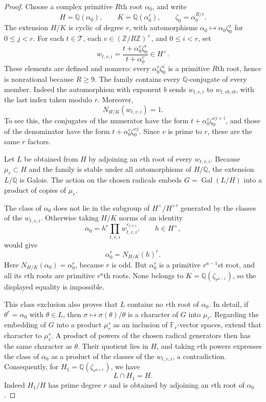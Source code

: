 \documentclass[11pt]{article}
\theoremstyle{definition}
\theoremstyle{remark}
\begin{document}
\begin{proof}
Choose a complex primitive $R$th root $\alpha_0$, and write
\[
 H=\mathbb Q(\alpha_0),\qquad
 K=\mathbb Q(\alpha_0^r),\qquad
 \zeta_0=\alpha_0^{R/r}.
\]
The extension $H/K$ is cyclic of degree $r$, with automorphisms
$\alpha_0\mapsto\alpha_0\zeta_0^j$ for $0\leq j<r$.
For each $t\in\mathcal T$, each
$v\in(\mathbb Z/R\mathbb Z)^\times$, and $0\leq i<r$, set
\[
 w_{t,v,i}
   =\frac{t+\alpha_0^v\zeta_0^i}{t+\alpha_0^v}\in H^\times.
\]
These elements are defined and nonzero: every
$\alpha_0^v\zeta_0^i$ is a primitive $R$th root, hence is
nonrational because $R\geq9$.
The family contains every $\mathbb Q$-conjugate of every member.
Indeed the automorphism with exponent $b$ sends
$w_{t,v,i}$ to $w_{t,vb,ib}$, with the last index taken modulo $r$.
Moreover,
\[
 N_{H/K}(w_{t,v,i})=1.
\]
To see this, the conjugates of the numerator have the form
$t+\alpha_0^v\zeta_0^{vj+i}$, and those of the denominator
have the form $t+\alpha_0^v\zeta_0^{vj}$.
Since $v$ is prime to $r$, these are the same $r$ factors.

Let $L$ be obtained from $H$ by adjoining an $r$th root of every
$w_{t,v,i}$.  Because $\mu_r\subset H$ and the family is stable
under all automorphisms of $H/\mathbb Q$, the extension
$L/\mathbb Q$ is Galois.  The action on the chosen radicals
embeds $G=\operatorname{Gal}(L/H)$ into a product of copies
of $\mu_r$.

The class of $\alpha_0$ does not lie in the subgroup of
$H^\times/H^{\times r}$ generated by the classes of the
$w_{t,v,i}$.  Otherwise taking $H/K$ norms of an identity
\[
 \alpha_0=h^r\prod_{t,v,i}w_{t,v,i}^{e_{t,v,i}},
 \qquad h\in H^\times,
\]
would give
\[
 \alpha_0^r=N_{H/K}(h)^r.
\]
Here $N_{H/K}(\alpha_0)=\alpha_0^r$, because $r$ is odd.
But $\alpha_0^r$ is a primitive $r^{a-1}$st root, and all its
$r$th roots are primitive $r^a$th roots.  None belongs to
$K=\mathbb Q(\zeta_{r^{a-1}})$, so the displayed equality is
impossible.

This class exclusion also proves that $L$ contains no $r$th
root of $\alpha_0$.  In detail, if $\theta^r=\alpha_0$ with
$\theta\in L$, then
$\sigma\mapsto\sigma(\theta)/\theta$ is a character of $G$
into $\mu_r$.  Regarding the embedding of $G$ into a product
$\mu_r^s$ as an inclusion of $\mathbb F_r$-vector spaces,
extend that character to $\mu_r^s$.  A product of powers of
the chosen radical generators then has the same character as
$\theta$.  Their quotient lies in $H$, and taking $r$th powers
expresses the class of $\alpha_0$ as a product of the classes
of the $w_{t,v,i}$, a contradiction.
Consequently, for
$H_1=\mathbb Q(\zeta_{r^{a+1}})$, we have
\[
 L\cap H_1=H.
\]
Indeed $H_1/H$ has prime degree $r$ and is obtained by adjoining
an $r$th root of $\alpha_0$.


\end{proof}
\end{document}
